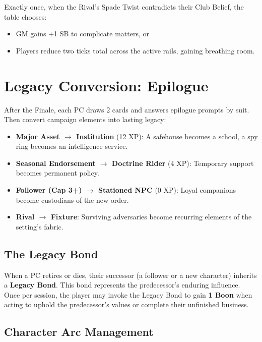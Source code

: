 Exactly once, when the Rival's Spade Twist contradicts their Club Belief, the table chooses:
\begin{itemize}
  \item GM gains +1 SB to complicate matters, or
  \item Players reduce two ticks total across the active rails, gaining breathing room.
\end{itemize}

\section{Legacy Conversion: Epilogue}
\label{sec:legacy-conversion}

After the Finale, each PC draws 2 cards and answers epilogue prompts by suit. Then convert campaign elements into lasting legacy:
\begin{itemize}
  \item \textbf{Major Asset $\rightarrow$ Institution} (12 XP): A safehouse becomes a school, a spy ring becomes an intelligence service.
  \item \textbf{Seasonal Endorsement $\rightarrow$ Doctrine Rider} (4 XP): Temporary support becomes permanent policy.
  \item \textbf{Follower (Cap 3+) $\rightarrow$ Stationed NPC} (0 XP): Loyal companions become custodians of the new order.
  \item \textbf{Rival $\rightarrow$ Fixture}: Surviving adversaries become recurring elements of the setting's fabric.
\end{itemize}

\subsection{The Legacy Bond}
\label{subsec:legacy-bond}

When a PC retires or dies, their successor (a follower or a new character) inherits a \textbf{Legacy Bond}. This bond represents the predecessor's enduring influence. Once per session, the player may invoke the Legacy Bond to gain \textbf{1 Boon} when acting to uphold the predecessor's values or complete their unfinished business.

\subsection{Character Arc Management}
\label{subsec:character-arcs}

